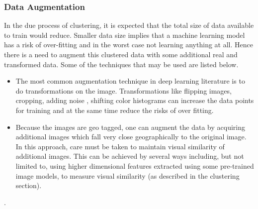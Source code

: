  
\subsubsection{Data Augmentation}
In the due process of clustering, it is expected that the total size of data available to train would reduce. Smaller data size implies that a machine learning model has a risk of over-fitting and in the worst case not learning anything at all. Hence there is a need to augment this clustered data with some additional real and transformed data. Some of the techniques that may be used are listed below.
\begin{itemize}
	\item The most common augmentation technique in deep learning literature is to do transformations on the image. Transformations like flipping images, cropping, adding noise , shifting color histograms can increase the data points for training and at the same time reduce the risks of over fitting.
	\item Because the images are geo tagged, one can augment the data by acquiring additional images which fall very close geographically to the original image. In this approach, care must be taken to maintain visual similarity of additional images. This can be achieved by several ways including, but not limited to, using higher dimensional features extracted using some pre-trained image models, to measure visual similarity (as described in the clustering section).
\end{itemize}. 



